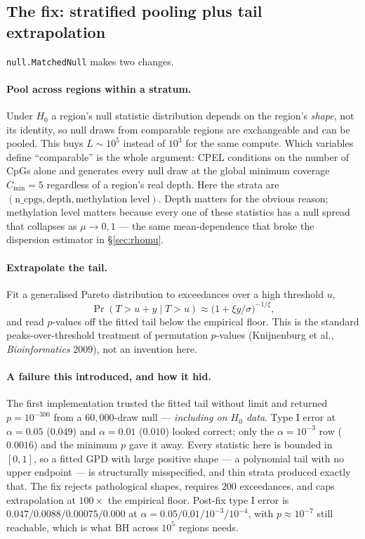 \documentclass[11pt]{article}
\begin{document}
\subsection{The fix: stratified pooling plus tail extrapolation}

\texttt{null.MatchedNull} makes two changes.

\paragraph{Pool across regions within a stratum.} Under $H_0$ a region's null
statistic distribution depends on the region's \emph{shape}, not its identity, so
null draws from comparable regions are exchangeable and can be pooled. This buys
$L \sim 10^5$ instead of $10^3$ for the same compute. Which variables define
``comparable'' is the whole argument: CPEL conditions on the number of CpGs alone
and generates every null draw at the global minimum coverage $C_{\min} = 5$
regardless of a region's real depth. Here the strata are
$(\text{n\_cpgs}, \text{depth}, \text{methylation level})$. Depth matters for the
obvious reason; methylation level matters because every one of these statistics
has a null spread that collapses as $\mu \to 0, 1$ --- the same mean-dependence
that broke the dispersion estimator in \S\ref{sec:rhomu}.

\paragraph{Extrapolate the tail.} Fit a generalised Pareto distribution to
exceedances over a high threshold $u$,
\begin{equation}
\Pr(T > u + y \mid T > u) \approx \bigl(1 + \xi y/\sigma\bigr)^{-1/\xi},
\end{equation}
and read $p$-values off the fitted tail below the empirical floor. This is the
standard peaks-over-threshold treatment of permutation $p$-values (Knijnenburg
et al., \emph{Bioinformatics} 2009), not an invention here.

\paragraph{A failure this introduced, and how it hid.} The first implementation
trusted the fitted tail without limit and returned $p = 10^{-300}$ from a
$60{,}000$-draw null --- \emph{including on $H_0$ data}. Type I error at
$\alpha = 0.05$ ($0.049$) and $\alpha = 0.01$ ($0.010$) looked correct; only the
$\alpha = 10^{-3}$ row ($0.0016$) and the minimum $p$ gave it away. Every
statistic here is bounded in $[0,1]$, so a fitted GPD with large positive shape
--- a polynomial tail with no upper endpoint --- is structurally misspecified,
and thin strata produced exactly that. The fix rejects pathological shapes,
requires $200$ exceedances, and caps extrapolation at $100\times$ the empirical
floor. Post-fix type I error is $0.047 / 0.0088 / 0.00075 / 0.000$ at
$\alpha = 0.05 / 0.01 / 10^{-3} / 10^{-4}$, with $p \approx 10^{-7}$ still
reachable, which is what BH across $10^5$ regions needs.
\end{document}
